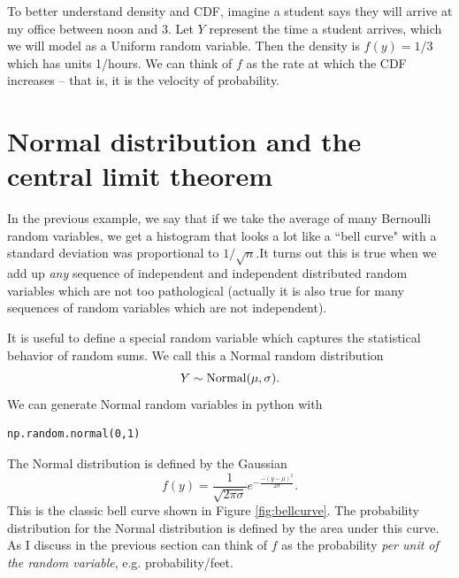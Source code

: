   
  To better understand density and CDF, imagine a student says they will arrive at my office between noon and 3. Let $Y$ represent the time a student arrives, which we will model as a Uniform random variable. Then the density is $f(y) = 1/3$ which has units 1/hours. We can think of $f$ as the rate at which the CDF increases -- that is, it is the velocity of probability. 
  
  
  
  
  \section{Normal distribution and the central limit theorem}

In the previous example, we say that if we take the average of many Bernoulli random variables, we get a histogram that looks a lot like a ``bell curve" with a standard deviation was proportional to $1/\sqrt{n}$.It turns out this is true when we add up \emph{any} sequence of independent and independent distributed  random variables which are not too pathological (actually it is also true for many sequences of random variables which are not independent). 

It is useful to define a special random variable which captures the statistical behavior of random sums.
We call this a Normal random distribution
\begin{equation}
Y \sim {\rm Normal}(\mu,\sigma).
\end{equation}
We can generate Normal random variables in python with
\begin{Verbatim}
np.random.normal(0,1)
\end{Verbatim}



The Normal distribution is defined by the Gaussian 
\begin{equation}
f(y) = \frac{1}{\sqrt{2\pi \sigma}}e^{-\frac{-(y-\mu)^2}{2\sigma}}.
\end{equation}
This is the classic bell curve shown in Figure \ref{fig:bellcurve}. The probability distribution for the Normal distribution is defined by the area under this curve. 
As I discuss in the previous section can think of $f$ as the probability \emph{per unit of the random variable}, e.g. probability/feet.  

